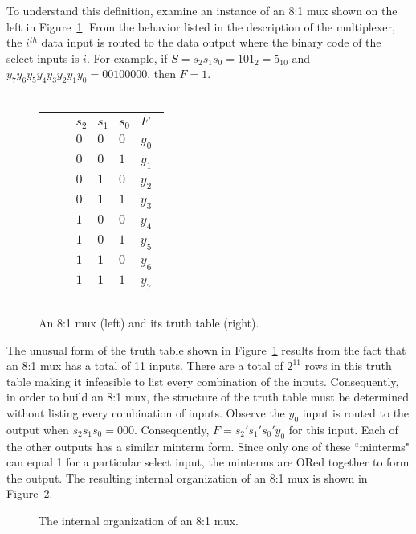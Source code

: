 To understand this definition, examine an
instance of an 8:1 mux shown on the left in Figure~\ref{fig:comboBB8:1}.
From the behavior listed in the description of the multiplexer, 
the $i^{th}$ data input is routed to the data
output where the binary code of the select inputs is $i$.
For example, if $S=s_2 s_1 s_0 = 101_2 = 5_{10}$  and 
$y_7 y_6 y_5 y_4 y_3 y_2 y_1 y_0 = 00100000$, then
$F=1$.
\\ \\
\begin{figure}[ht]
\begin{tabular}{p{1.5in}p{0.5in}l}
\includegraphics[0mm,20mm][12mm,12mm]{8_1} & &
$\begin{array}{c|c|c||c}
s_2 & s_1 & s_0 & F \\ \hline
0 & 0 & 0 & y_0 \\ \hline
0 & 0 & 1 & y_1 \\ \hline
0 & 1 & 0 & y_2 \\ \hline
0 & 1 & 1 & y_3 \\ \hline
1 & 0 & 0 & y_4 \\ \hline
1 & 0 & 1 & y_5 \\ \hline
1 & 1 & 0 & y_6 \\ \hline
1 & 1 & 1 & y_7 \\
\end{array}$
\end{tabular}
\caption{An 8:1 mux (left) and its truth table (right).}
\label{fig:comboBB8:1}
\end{figure}

The unusual form of the truth table shown in Figure~\ref{fig:comboBB8:1}
results from the fact that an 8:1 mux has a total of 11 
inputs.  There are a total of $2^{11}$ rows in this truth table
making it infeasible to list every combination of the inputs.
Consequently, in order to build an 8:1 mux, the structure of the truth table 
must be determined without
listing every combination of inputs.  Observe the $y_0$ input is routed 
to the output when 
$s_2 s_1 s_0 = 000$.  Consequently, $F=s_2' s_1' s_0' y_0$
for this input.  Each of the other outputs has a similar
minterm form.  Since only one of these ``minterms" can equal
1 for a particular select input, the minterms are ORed
together to form the output. The resulting internal 
organization of an 8:1 mux is shown in Figure~\ref{fig:comboBB8:1Guts}.

\begin{figure}[ht]
\caption{The internal organization of an 8:1 mux.}
\label{fig:comboBB8:1Guts}
\end{figure}

